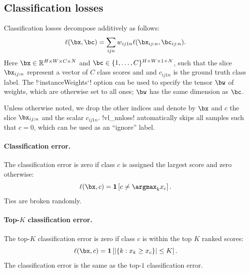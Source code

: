 \subsection{Classification losses}\label{s:loss-classification}

Classification losses decompose additively as follows:
\begin{equation}\label{e:addloss}
\ell(\bx,\bc) = \sum_{ijn} w_{ij1n} \ell(\bx_{ij:n}, \bc_{ij:n}).
\end{equation}
Here $\bx \in \mathbb{R}^{H \times W \times C \times N}$ and $\bc \in \{1, \dots, C\}^{H \times W \times 1 \times N}$, such that the slice $\bx_{ij:n}$ represent a vector of $C$ class scores and and $c_{ij1n}$ is the ground truth class label. The !`instanceWeights`! option can be used to specify the tensor $\bw$ of weights, which are otherwise set to all ones; $\bw$ has the same dimension as $\bc$.

Unless otherwise noted, we drop the other indices and denote by $\bx$ and $c$  the slice $\bx_{ij:n}$ and the scalar $c_{ij1n}$. !vl_nnloss! automatically skips all samples such that $c=0$, which can be used as an ``ignore'' label.

\paragraph{Classification error.} The classification error is zero if class $c$ is assigned the largest score and zero otherwise:
\begin{equation}\label{e:loss-classerror}
\ell(\bx,c) = \mathbf{1}\left[c \not= \argmax_k x_c\right].
\end{equation}
Ties are broken randomly.

\paragraph{Top-$K$ classification error.} The top-$K$ classification error is zero if class $c$ is within the top $K$ ranked scores:
\begin{equation}\label{e:loss-classerror}
\ell(\bx,c) = \mathbf{1}\left[ |\{k : x_k \geq x_c \}| \leq K \right].
\end{equation}
The classification error is the same as the top-$1$ classification error.

